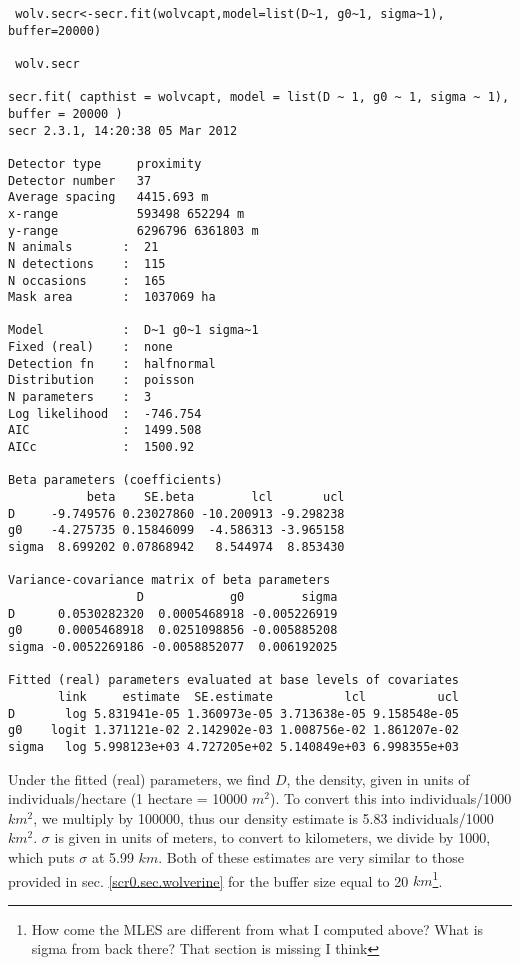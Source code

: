 {\small
\begin{verbatim}
 wolv.secr<-secr.fit(wolvcapt,model=list(D~1, g0~1, sigma~1), buffer=20000)

 wolv.secr

secr.fit( capthist = wolvcapt, model = list(D ~ 1, g0 ~ 1, sigma ~ 1), buffer = 20000 )
secr 2.3.1, 14:20:38 05 Mar 2012

Detector type     proximity 
Detector number   37 
Average spacing   4415.693 m 
x-range           593498 652294 m 
y-range           6296796 6361803 m 
N animals       :  21  
N detections    :  115 
N occasions     :  165 
Mask area       :  1037069 ha 

Model           :  D~1 g0~1 sigma~1 
Fixed (real)    :  none 
Detection fn    :  halfnormal 
Distribution    :  poisson 
N parameters    :  3 
Log likelihood  :  -746.754 
AIC             :  1499.508 
AICc            :  1500.92 

Beta parameters (coefficients) 
           beta    SE.beta        lcl       ucl
D     -9.749576 0.23027860 -10.200913 -9.298238
g0    -4.275735 0.15846099  -4.586313 -3.965158
sigma  8.699202 0.07868942   8.544974  8.853430

Variance-covariance matrix of beta parameters 
                  D            g0        sigma
D      0.0530282320  0.0005468918 -0.005226919
g0     0.0005468918  0.0251098856 -0.005885208
sigma -0.0052269186 -0.0058852077  0.006192025

Fitted (real) parameters evaluated at base levels of covariates 
       link     estimate  SE.estimate          lcl          ucl
D       log 5.831941e-05 1.360973e-05 3.713638e-05 9.158548e-05
g0    logit 1.371121e-02 2.142902e-03 1.008756e-02 1.861207e-02
sigma   log 5.998123e+03 4.727205e+02 5.140849e+03 6.998355e+03
\end{verbatim}
}

Under the fitted (real) parameters, we find $D$, the density, given in
units of individuals/hectare (1 hectare = 10000 $m^2$).  To convert this
into individuals/1000 $km^2$, we multiply by 100000, thus our density
estimate is 5.83 individuals/1000 $km^2$.  $\sigma$ is given in units of
meters, to convert to kilometers, we divide by 1000, which puts $\sigma$
at 5.99 $km$.  Both of these estimates are very similar to those
provided in sec. \ref{scr0.sec.wolverine} for the buffer size equal to
20 $km$\footnote{How come the MLES are different from what I computed
  above?  What is sigma from back there? That section is missing
  I think}.

